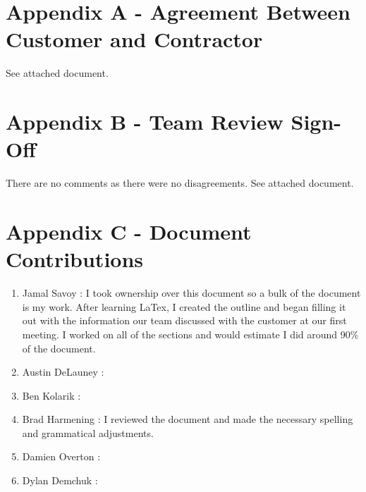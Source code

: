 \documentclass{article}
\begin{document}

\section{Appendix A - Agreement Between Customer and Contractor}\label{sec:apendixA}

\vspace{2.5mm}

\begin{addmargin}[2em]{0em}

See attached document.

\end{addmargin}

\section{Appendix B - Team Review Sign-Off}\label{sec:appendixB}

\vspace{2.5mm}

\begin{addmargin}[2em]{0em}

There are no comments as there were no disagreements. See attached document.

\end{addmargin}

\section{Appendix C - Document Contributions}\label{sec:appendixC}

\vspace{2.5mm}

\begin{addmargin}[2em]{0em}

\begin{enumerate}

\item Jamal Savoy : I took ownership over this document so a bulk of the document is my work. After learning LaTex, I created the outline and began filling it out with the information our team discussed with the customer at our first meeting. I worked on all of the sections and would estimate I did around 90\% of the document.

\item Austin DeLauney : 

\item Ben Kolarik : 

\item Brad Harmening : I reviewed the document and made the necessary spelling and grammatical adjustments.

\item Damien Overton : 

\item Dylan Demchuk : 

\end{enumerate}
\end{addmargin}
\end{document}
